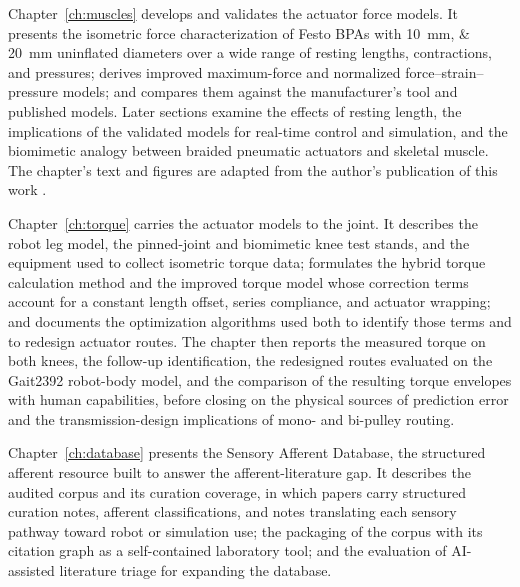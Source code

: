 Chapter~\ref{ch:muscles} develops and validates the actuator force models. It presents the isometric force characterization of Festo BPAs with \qtylist{10;20}{\mm} uninflated diameters over a wide range of resting lengths, contractions, and pressures; derives improved maximum-force and normalized force--strain--pressure models; and compares them against the manufacturer's tool and published models. Later sections examine the effects of resting length, the implications of the validated models for real-time control and simulation, and the biomimetic analogy between braided pneumatic actuators and skeletal muscle. The chapter's text and figures are adapted from the author's publication of this work \citep{bolen_2026}.

Chapter~\ref{ch:torque} carries the actuator models to the joint. It describes the robot leg model, the pinned-joint and biomimetic knee test stands, and the equipment used to collect isometric torque data; formulates the hybrid torque calculation method and the improved torque model whose correction terms account for a constant length offset, series compliance, and actuator wrapping; and documents the optimization algorithms used both to identify those terms and to redesign actuator routes. The chapter then reports the measured torque on both knees, the follow-up identification, the redesigned routes evaluated on the Gait2392 robot-body model, and the comparison of the resulting torque envelopes with human capabilities, before closing on the physical sources of prediction error and the transmission-design implications of mono- and bi-pulley routing.

Chapter~\ref{ch:database} presents the Sensory Afferent Database, the structured afferent resource built to answer the afferent-literature gap. It describes the audited corpus and its curation coverage, in which papers carry structured curation notes, afferent classifications, and notes translating each sensory pathway toward robot or simulation use; the packaging of the corpus with its citation graph as a self-contained laboratory tool; and the evaluation of AI-assisted literature triage for expanding the database.

